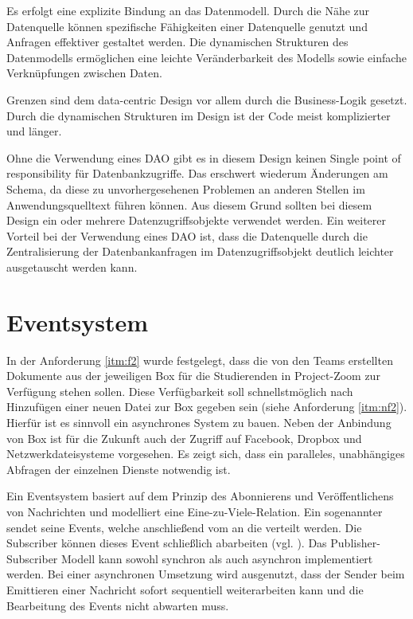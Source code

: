 Es erfolgt eine explizite Bindung an das Datenmodell. Durch die Nähe zur Datenquelle können spezifische Fähigkeiten einer Datenquelle genutzt und Anfragen effektiver gestaltet werden. Die dynamischen Strukturen des Datenmodells ermöglichen eine leichte Veränderbarkeit des Modells sowie einfache Verknüpfungen zwischen Daten.

Grenzen sind dem data-centric Design vor allem durch die Business-Logik gesetzt. Durch die dynamischen Strukturen im Design ist der Code meist komplizierter und länger.

Ohne die Verwendung eines DAO gibt es in diesem Design keinen Single point of responsibility für Datenbankzugriffe. Das erschwert wiederum Änderungen am Schema, da diese zu unvorhergesehenen Problemen an anderen Stellen im Anwendungsquelltext führen können. Aus diesem Grund sollten bei diesem Design ein oder mehrere Datenzugriffsobjekte verwendet werden. Ein weiterer Vorteil bei der Verwendung eines DAO ist, dass die Datenquelle durch die Zentralisierung der Datenbankanfragen im Datenzugriffsobjekt deutlich leichter ausgetauscht werden kann.


\section{Eventsystem}
In der Anforderung \ref{itm:f2} wurde festgelegt, dass die von den Teams erstellten Dokumente aus der jeweiligen \gls{Box} für die Studierenden in Project-Zoom zur Verfügung stehen sollen. Diese Verfügbarkeit soll schnellstmöglich nach Hinzufügen einer neuen Datei zur \gls{Box} gegeben sein (siehe Anforderung \ref{itm:nf2}). Hierfür ist es sinnvoll ein asynchrones System zu bauen.  Neben der Anbindung von \gls{Box} ist für die Zukunft auch der Zugriff auf Facebook, Dropbox und Netzwerkdateisysteme vorgesehen. Es zeigt sich, dass ein paralleles, unabhängiges Abfragen der einzelnen Dienste notwendig ist.

Ein Eventsystem basiert auf dem Prinzip des Abonnierens und Veröffentlichens von Nachrichten und modelliert eine Eine-zu-Viele-Relation. Ein sogenannter  sendet seine Events, welche anschließend vom  an die  verteilt werden. Die Subscriber können dieses Event schließlich abarbeiten (vgl. \cite[p.~327]{gang-of-four}). Das Publisher-Subscriber Modell kann sowohl synchron als auch asynchron implementiert werden. Bei einer asynchronen Umsetzung wird ausgenutzt, dass der Sender beim Emittieren einer Nachricht sofort sequentiell weiterarbeiten kann und die Bearbeitung des Events nicht abwarten muss.

